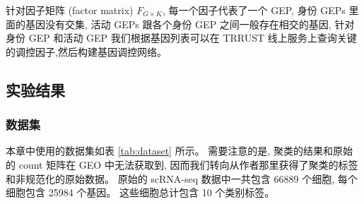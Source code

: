 针对因子矩阵 (factor matrix) $F_{G \times K}$, 每一个因子代表了一个 GEP, 
身份 GEPs 里面的基因没有交集, 活动 GEPs 跟各个身份 GEP 之间一般存在相交的基因, 
针对身份 GEP 和活动 GEP 我们根据基因列表可以在 TRRUST 线上服务上查询关键的调控因子,然后构建基因调控网络。


\subsection{实验结果}


\subsubsection{数据集}
本章中使用的数据集如表 \ref{tab:dataset} 所示。
需要注意的是, 聚类的结果和原始的 count 矩阵在 GEO 中无法获取到,
因而我们转向从作者那里获得了聚类的标签和非规范化的原始数据。
原始的 scRNA-seq 数据中一共包含 66889 个细胞, 每个细胞包含 25984 个基因。
这些细胞总计包含 10 个类别标签。

\begin{table}[!htbp]
    \caption{\label{tab:dataset}使用的公开数据集} 
\end{table}

